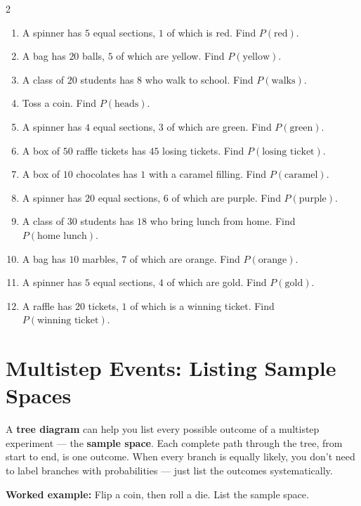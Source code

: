 \documentclass[11pt]{article}
\newcommand{\ans}{\hrulefill}
\newcommand{\anshere}{\par\vspace{0.3em}\noindent\ans\par\vspace{0.3em}}
\begin{document}
\begin{multicols}{2}
\begin{enumerate}[label=(\alph*)]
  \item A spinner has $5$ equal sections, $1$ of which is red. Find $P(\text{red})$.
  \anshere
  \item A bag has $20$ balls, $5$ of which are yellow. Find $P(\text{yellow})$.
  \anshere
  \item A class of $20$ students has $8$ who walk to school. Find $P(\text{walks})$.
  \anshere
  \item Toss a coin. Find $P(\text{heads})$.
  \anshere
  \item A spinner has $4$ equal sections, $3$ of which are green. Find $P(\text{green})$.
  \anshere
  \item A box of $50$ raffle tickets has $45$ losing tickets. Find $P(\text{losing ticket})$.
  \anshere
  \item A box of $10$ chocolates has $1$ with a caramel filling. Find $P(\text{caramel})$.
  \anshere
  \item A spinner has $20$ equal sections, $6$ of which are purple. Find $P(\text{purple})$.
  \anshere
  \item A class of $30$ students has $18$ who bring lunch from home. Find $P(\text{home
    lunch})$.
  \anshere
  \item A bag has $10$ marbles, $7$ of which are orange. Find $P(\text{orange})$.
  \anshere
  \item A spinner has $5$ equal sections, $4$ of which are gold. Find $P(\text{gold})$.
  \anshere
  \item A raffle has $20$ tickets, $1$ of which is a winning ticket. Find $P(\text{winning
    ticket})$.
  \anshere
\end{enumerate}
\end{multicols}
\endgroup

\newpage

\section*{Multistep Events: Listing Sample Spaces}
\noindent A \textbf{tree diagram} can help you list every possible outcome of a multistep
experiment --- the \textbf{sample space}. Each complete path through the tree, from start to
end, is one outcome. When every branch is equally likely, you don't need to label branches with
probabilities --- just list the outcomes systematically.

\vspace{0.3em}
\noindent\textbf{Worked example:} Flip a coin, then roll a die. List the sample space.
\end{document}
